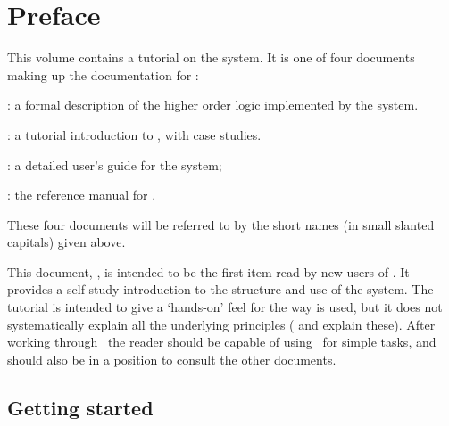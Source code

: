 \chapter*{Preface}
\label{intro}

This volume contains a tutorial on the \HOLW{} system.  It is one of four
documents making up the documentation for \HOLW:

\begin{myenumerate}
\item \LOGIC: a formal description of the higher order logic
  implemented by the \HOLW{} system.
\item \TUTORIAL: a tutorial introduction to \HOLW, with case studies.
\item \DESCRIPTION: a detailed user's guide for the \HOLW{} system;
\item \REFERENCE: the reference manual for \HOLW.
\end{myenumerate}

\noindent These four documents will be referred to by the short names (in
small slanted capitals) given above.

This document, \TUTORIAL, is intended to be the first item read by new
users of \HOLW.  It provides a self-study introduction to the structure
and use of the system.  The tutorial is intended to give a `hands-on'
feel for the way \HOLW{} is used, but it does not systematically
explain all the underlying principles (\DESCRIPTION{} and \LOGIC{}
explain these).  After working through \TUTORIAL\ the reader should be
capable of using \HOLW\ for simple tasks, and should also be in a
position to consult the other documents.

\section*{Getting started}

